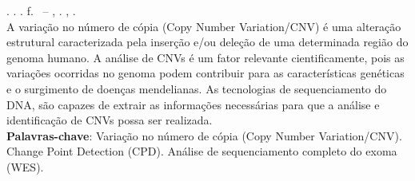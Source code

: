 
\begin{resumo}[RESUMO]
\begin{SingleSpacing}

\imprimirautorcitacao. \imprimirtitulo. \imprimirdata. \pageref {LastPage} f. \imprimirprojeto\ – \imprimirprograma, \imprimirinstituicao. \imprimirlocal, \imprimirdata.\\

A variação no número de cópia (Copy Number Variation/CNV) é uma alteração estrutural caracterizada pela inserção e/ou deleção de uma determinada região do genoma humano.
A análise de CNVs é um fator relevante cientificamente, pois as variações ocorridas no genoma podem contribuir para as características genéticas e o surgimento de doenças mendelianas.
As tecnologias de sequenciamento do DNA, são capazes de extrair as informações necessárias para que a análise e identificação de CNVs possa ser realizada. \\



\textbf{Palavras-chave}: Variação no número de cópia (Copy Number Variation/CNV). Change Point Detection (CPD). Análise de sequenciamento completo do exoma (WES).

\end{SingleSpacing}
\end{resumo}

